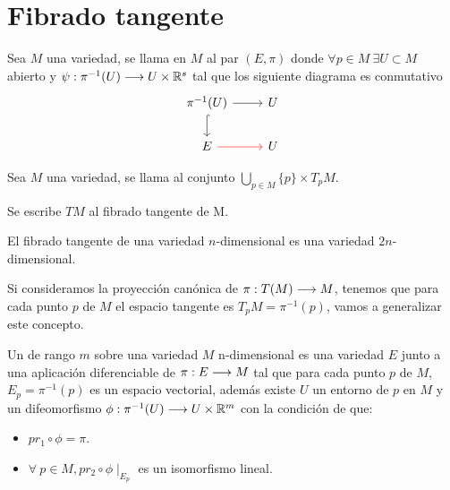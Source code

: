 \section{Fibrado tangente}\label{sec:fibrado-tangente}
\begin{definition}
  Sea $M$ una variedad, se llama  en $M$ al par $(E, \pi)$ donde $\forall
  p\in M\ \exists U\subset M$ abierto y $\psi:\pi^{-1}(U)\longrightarrow U\times\mathbb{R}^s$ tal que los siguiente diagrama es
  conmutativo
  \[
    \begin{tikzcd}
      \pi^{-1}(U)\arrow[r]\arrow[d, hook] & U \\
      E\arrow[r, red] & U
    \end{tikzcd}
  \]
\end{definition}
\begin{definition}
  Sea $M$ una variedad, se llama  al
  conjunto $\bigcup_{p\in M}\{p\}\times T_pM$.
\end{definition}
\begin{notation}
  Se escribe $TM$ al fibrado tangente de M\@.
\end{notation}
\begin{proposition}
  El fibrado tangente de una variedad $n$-dimensional es una variedad $2n$-dimensional.
\end{proposition}

Si consideramos la proyección canónica de $\pi:T(M)\longrightarrow M$, tenemos que para cada punto $p$ de
$M$ el espacio tangente es $T_pM=\pi^{-1}(p)$, vamos a generalizar este concepto.

\begin{definition}
  Un  de rango $m$ sobre una variedad $M$
  n-dimensional es una variedad $E$ junto a una aplicación diferenciable de $\pi:E\longrightarrow M$ tal
  que para cada punto $p$ de $M$, $E_p=\pi^{-1}(p)$ es un espacio vectorial, además existe $U$ un
  entorno de $p$ en $M$ y un difeomorfismo $\phi:\pi^{-1}(U)\longrightarrow U\times\mathbb{R}^m$ con la condición
  de que:
  \begin{itemize}
    \item $pr_1\circ\phi=\pi$.
    \item $\forall\ p\in M, pr_2\circ\phi\mid_{E_p}$ es un isomorfismo lineal.
  \end{itemize}
\end{definition}


